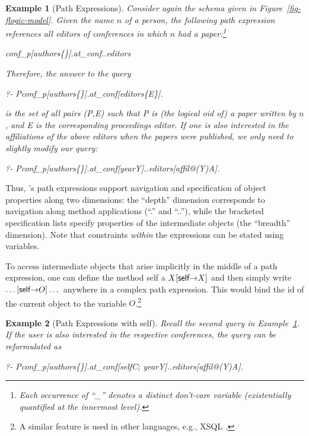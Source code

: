 \documentclass[11pt]{report}
\newtheorem{example}{Example}[section]
\begin{document}
\begin{example}[Path Expressions]\label{Ex:PathExpr}
  Consider again the schema given in Figure~\ref{fig-flogic-model}.
  Given the name $n$ of a person, the following path expression
  references all editors of conferences in which $n$ had a
  paper:\footnote{Each occurrence of ``\_'' denotes a distinct
    don't-care variable (existentially quantified at the
    innermost level).}
\begin{qrules}
  \anon\isa conf\_p[authors\mvd\{\anon [name\fd $n$]\}].at\_conf..editors
\end{qrules}
Therefore, the answer to the \emph{query}
\begin{qrules}
  ?- P\isa conf\_p[authors\mvd\{\anon [name\fd
  $n$]\}].at\_conf[editors\mvd\{E\}].
\end{qrules}
is the set of all pairs (\textsf{P},\textsf{E}) such that \textsf{P}
is (the logical oid of) a paper written by $n$, and \textsf{E} is the
corresponding proceedings editor.  If one is also interested in the
affiliations of the above editors when the papers were published, we only
need to slightly modify our query:
\begin{qrules}
  ?- P\isa conf\_p[authors\mvd\{\anon [name\fd
  $n$]\}].at\_conf[year\fd Y]..editors[affil@(Y)\fd A].
\end{qrules}
\end{example}
Thus, \FLORA's path expressions support navigation and specification
of object properties along two dimensions: the ``depth'' dimension
corresponds to navigation along method applications (``.''  and
``..''), while the bracketed specification lists specify
properties of the intermediate objects (the ``breadth'' dimension). Note
that constraints \emph{within} the expressions can be stated using
variables.

To access intermediate objects that arise implicitly in the middle
of a path expression, one can define the method \textsf{self} a
$X[\textsf{self}{\rightarrow} X]$ and then simply
write $\dots[\textsf{self}{\rightarrow} O]\dots$ anywhere in a complex
path expression. This would bind the id of the current object to the
variable $O$.\footnote{
  A similar feature is used in other
  languages, e.g., XSQL \cite{xsql-92}.
  }

\begin{example}[Path Expressions with \textsf{self}]\label{ex-path-self}
  Recall the second query in Example~\ref{Ex:PathExpr}. If the user is
  also interested in the respective conferences, the query can be
  reformulated as
\begin{qrules}
   ?- P\isa conf\_p[authors\mvd\{\anon [name\fd
   $n$]\}].at\_conf[self\fd C; year\fd Y]..editors[affil@(Y)\fd A]. 
\end{qrules}
\end{example}
\end{document}
